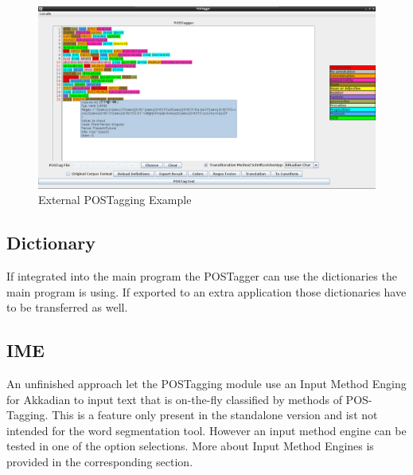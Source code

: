 \documentclass[10pt,a4paper,titlepage]{report}
\begin{document}
	\begin{figure}[htb]
		\centering
		\includegraphics[width=1\textwidth]{images/postagging.png}
		\caption{External POSTagging Example}
		\label{fig:postagging}
	\end{figure}
	\subsection{Dictionary}
	If integrated into the main program the POSTagger can use the dictionaries the main program is using. If exported to an extra application those dictionaries have to be transferred as well.
	\subsection{IME}
	An unfinished approach let the POSTagging module use an Input Method Enging for Akkadian to input text that is on-the-fly classified by methods of POS-Tagging. This is a feature only present in the standalone version and ist not intended for the word segmentation tool. However an input method engine can be tested in one of the option selections. More about Input Method Engines is provided in the corresponding section.
\end{document}
